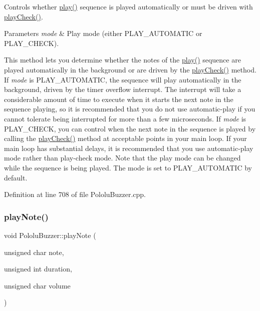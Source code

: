 Controls whether {\ttfamily \hyperlink{class_pololu_buzzer_a22f45ef7cdf9dc8fc54e617244368277}{play()}} sequence is played automatically or must be driven with {\ttfamily \hyperlink{class_pololu_buzzer_a427225dcc85c1e65078e4397b9890929}{play\+Check()}}. 


\begin{DoxyParams}{Parameters}
{\em mode} & Play mode (either {\ttfamily P\+L\+A\+Y\+\_\+\+A\+U\+T\+O\+M\+A\+T\+IC} or {\ttfamily P\+L\+A\+Y\+\_\+\+C\+H\+E\+CK}).\\
\hline
\end{DoxyParams}
This method lets you determine whether the notes of the {\ttfamily \hyperlink{class_pololu_buzzer_a22f45ef7cdf9dc8fc54e617244368277}{play()}} sequence are played automatically in the background or are driven by the {\ttfamily \hyperlink{class_pololu_buzzer_a427225dcc85c1e65078e4397b9890929}{play\+Check()}} method. If {\itshape mode} is {\ttfamily P\+L\+A\+Y\+\_\+\+A\+U\+T\+O\+M\+A\+T\+IC}, the sequence will play automatically in the background, driven by the timer overflow interrupt. The interrupt will take a considerable amount of time to execute when it starts the next note in the sequence playing, so it is recommended that you do not use automatic-\/play if you cannot tolerate being interrupted for more than a few microseconds. If {\itshape mode} is {\ttfamily P\+L\+A\+Y\+\_\+\+C\+H\+E\+CK}, you can control when the next note in the sequence is played by calling the {\ttfamily \hyperlink{class_pololu_buzzer_a427225dcc85c1e65078e4397b9890929}{play\+Check()}} method at acceptable points in your main loop. If your main loop has substantial delays, it is recommended that you use automatic-\/play mode rather than play-\/check mode. Note that the play mode can be changed while the sequence is being played. The mode is set to {\ttfamily P\+L\+A\+Y\+\_\+\+A\+U\+T\+O\+M\+A\+T\+IC} by default. 

Definition at line 708 of file Pololu\+Buzzer.\+cpp.

\mbox{\label{class_pololu_buzzer_a989d410dd6cdb7abfa136c3734040fb5}} 
\subsubsection{\texorpdfstring{play\+Note()}{playNote()}}
{\footnotesize\ttfamily void Pololu\+Buzzer\+::play\+Note (\begin{DoxyParamCaption}\item[{unsigned char}]{note,  }\item[{unsigned int}]{duration,  }\item[{unsigned char}]{volume }\end{DoxyParamCaption})\hspace{0.3cm}{\ttfamily [static]}}



